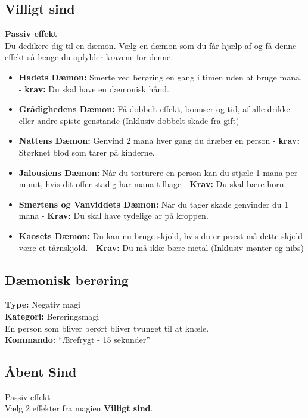 \subsection*{Villigt sind}
\textbf{Passiv effekt}\\
Du dedikere dig til en dæmon. Vælg en dæmon som du får hjælp af og få denne effekt så længe du opfylder kravene for denne.
\begin{itemize}
    \item \textbf{Hadets Dæmon:} Smerte ved berøring en gang i timen uden at bruge mana. - \textbf{krav:} Du skal have en dæmonisk hånd.
    \item \textbf{Grådighedens Dæmon:} Få dobbelt effekt, bonuser og tid, af alle drikke eller andre spiste genstande (Inklusiv dobbelt skade fra gift)
    \item \textbf{Nattens Dæmon:} Genvind 2 mana hver gang du dræber en person - \textbf{krav:} Størknet blod som tårer på kinderne.
    \item \textbf{Jalousiens Dæmon:} Når du torturere en person kan du stjæle 1 mana per minut, hvis dit offer stadig har mana tilbage - \textbf{Krav:} Du skal bære horn.
    \item \textbf{Smertens og Vanviddets Dæmon:} Når du tager skade genvinder du 1 mana - \textbf{Krav:} Du skal have tydelige ar på kroppen.
    \item \textbf{Kaosets Dæmon:} Du kan nu bruge skjold, hvis du er præst må dette skjold være et tårnskjold. - \textbf{Krav:} Du må ikke bære metal (Inklusiv mønter og nibs)
\end{itemize}

\subsection*{Dæmonisk berøring}
\textbf{Type:} Negativ magi\\
\textbf{Kategori:} Berøringsmagi\\
En person som bliver berørt bliver tvunget til at knæle.\\
\textbf{Kommando:} “Ærefrygt - 15 sekunder”

\subsection*{Åbent Sind}
Passiv effekt\\
Vælg 2 effekter fra magien \textbf{Villigt sind}.

